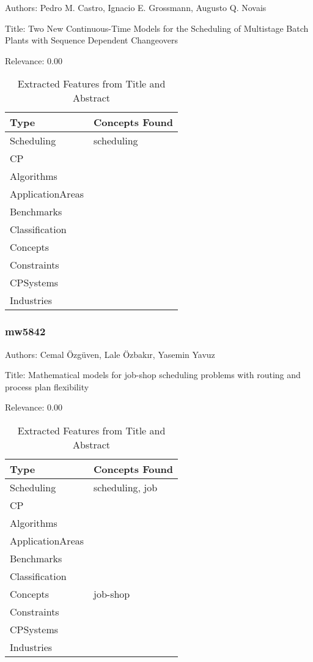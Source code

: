 Authors: Pedro M. Castro, Ignacio E. Grossmann, Augusto Q. Novais

Title: Two New Continuous-Time Models for the Scheduling of Multistage Batch Plants with Sequence Dependent Changeovers

Relevance:  0.00

{\scriptsize
\begin{longtable}{p{2cm}p{20cm}}
\caption{Extracted Features from Title and Abstract}\\ \toprule
Type & Concepts Found\\ \midrule
\endhead
\bottomrule
\endfoot
Scheduling & scheduling\\ 
CP & \\ 
Algorithms & \\ 
ApplicationAreas & \\ 
Benchmarks & \\ 
Classification & \\ 
Concepts & \\ 
Constraints & \\ 
CPSystems & \\ 
Industries & \\ 
\end{longtable}
}



\subsubsection{mw5842}
\label{mw:mw5842}

Authors: Cemal Özgüven, Lale Özbakır, Yasemin Yavuz

Title: Mathematical models for job-shop scheduling problems with routing and process plan flexibility

Relevance:  0.00

{\scriptsize
\begin{longtable}{p{2cm}p{20cm}}
\caption{Extracted Features from Title and Abstract}\\ \toprule
Type & Concepts Found\\ \midrule
\endhead
\bottomrule
\endfoot
Scheduling & scheduling, job\\ 
CP & \\ 
Algorithms & \\ 
ApplicationAreas & \\ 
Benchmarks & \\ 
Classification & \\ 
Concepts & job-shop\\ 
Constraints & \\ 
CPSystems & \\ 
Industries & \\ 
\end{longtable}
}



